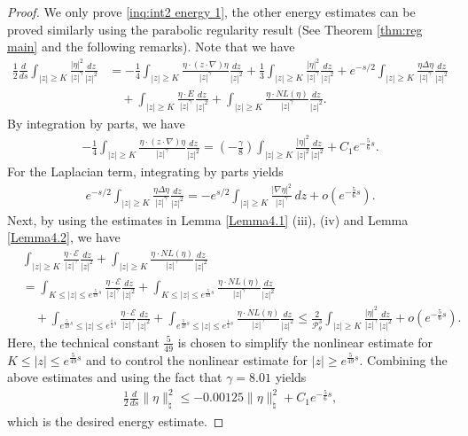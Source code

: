 \documentclass[11pt,reqno]{amsart}
\theoremstyle{definition}
\theoremstyle{bfremark}
\numberwithin{equation}{section}
\begin{document}
\begin{proof}
We only prove \ref{inq:int2 energy 1}, the other energy estimates can be proved similarly using the parabolic regularity result (See Theorem \ref{thm:reg main} and the following remarks). Note that we have
\begin{align*}
    \frac{1}{2}\frac{d}{ds}\int_{|z| \geq K}\frac{|\eta|^2}{|z|^{\gamma}}\frac{dz}{|z|^2}&=-\frac{1}{4}\int_{|z| \geq K}\frac{\eta \cdot (z \cdot \nabla)\eta}{|z|^{\gamma}}\frac{dz}{|z|^2}+\frac{1}{3}\int_{|z| \geq K}\frac{|\eta|^2}{|z|^{\gamma}}\frac{dz}{|z|^2}+e^{-s/2}\int_{|z| \geq K}\frac{\eta \Delta \eta}{|z|^{\gamma}}\frac{dz}{|z|^2}\\
    & \quad +\int_{|z| \geq K}\frac{\eta \cdot E}{|z|^{\gamma}}\frac{dz}{|z|^2}+\int_{|z| \geq K}\frac{\eta \cdot NL(\eta)}{|z|^{\gamma}}\frac{dz}{|z|^2}.
\end{align*}
By integration by parts, we have
\begin{align*}
    -\frac{1}{4}\int_{|z| \geq K}\frac{\eta \cdot (z \cdot \nabla)\eta}{|z|^{\gamma}}\frac{dz}{|z|^2}=\left(-\frac{\gamma}{8}\right)\int_{|z| \geq K}\frac{|\eta|^2}{|z|^2}\frac{dz}{|z|^2}+C_1e^{-\frac{5}{6}s}.
\end{align*}
For the Laplacian term, integrating by parts yields
\begin{align*}
    e^{-s/2}\int_{|z| \geq K}\frac{\eta \Delta \eta}{|z|^{\gamma}}\frac{dz}{|z|^2}=-e^{s/2}\int_{|z|\geq K}\frac{|\nabla \eta|^2}{|z|^{\gamma}}\,dz+o(e^{-\frac{5}{6}s}).
\end{align*}
Next, by using the estimates in Lemma \ref{Lemma4.1} (iii), (iv) and Lemma \ref{Lemma4.2}, we have
\begin{align*}
    &\int_{|z| \geq K}\frac{\eta \cdot \mathcal{E}}{|z|^{\gamma}}\frac{dz}{|z|^2}+\int_{|z| \geq K}\frac{\eta \cdot NL(\eta)}{|z|^{\gamma}}\frac{dz}{|z|^2}\\
    &=\int_{K \leq |z| \leq e^{\frac{5}{49}s}}\frac{\eta \cdot \mathcal{E}}{|z|^{\gamma}}\frac{dz}{|z|^2}+\int_{K \leq |z| \leq e^{\frac{5}{49}s}}\frac{\eta \cdot NL(\eta)}{|z|^{\gamma}}\frac{dz}{|z|^2}\\
    &\quad+ \int_{e^{\frac{5}{49}s} \leq |z| \leq e^{\frac{1}{4}s}}\frac{\eta \cdot \mathcal{E}}{|z|^{\gamma}}\frac{dz}{|z|^2} +\int_{e^{\frac{5}{49}s} \leq |z| \leq e^{\frac{1}{4}s}}\frac{\eta \cdot NL(\eta)}{|z|^{\gamma}}\frac{dz}{|z|^2} \leq\frac{2}{\mathcal{P}_{\theta}^3}\int_{|z| \geq K}\frac{|\eta|^2}{|z|^{\gamma}}\frac{dz}{|z|^2}+o(e^{-\frac{5}{6}s}).
\end{align*}
Here, the technical constant \(\frac{5}{49}\) is chosen to simplify the nonlinear estimate for \(K \leq |z| \leq e^{\frac{5}{49}s}\) and to control the nonlinear estimate for \(|z| \geq e^{\frac{5}{49}s}\). Combining the above estimates and using the fact that \(\gamma=8.01\) yields
\begin{align*}
        \frac{1}{2}\frac{d}{ds}\|\eta\|_{\natural}^2 \leq -0.00125\|\eta\|_{\natural}^2+C_1e^{-\frac{5}{6}s},
    \end{align*}
    which is the desired energy estimate.
\end{proof}
\end{document}
